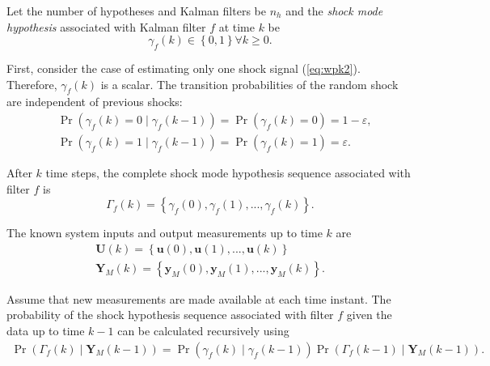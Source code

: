 Let the number of hypotheses and Kalman filters be $n_h$ and the \textit{shock mode hypothesis} associated with Kalman filter $f$ at time $k$ be
%
\begin{equation} \label{eq:gammak}
	\gamma_{f}(k) \in \left\{0, 1 \right\} \forall{k \ge 0}.
\end{equation}

First, consider the case of estimating only one shock signal (\ref{eq:wpk2}). Therefore, $\gamma_f(k)$ is a scalar. The transition probabilities of the random shock are independent of previous shocks:
%
\begin{equation} \label{eq:Pr_gammak_given_gammakm1}
	\begin{aligned}
		& \Pr\left(\gamma_{f}(k)=0 \mid \gamma_{f}(k-1)\right) = \Pr\left(\gamma_{f}(k)=0\right) = 1-\varepsilon, \\
		& \Pr\left(\gamma_{f}(k)=1 \mid \gamma_{f}(k-1)\right) = \Pr\left(\gamma_{f}(k)=1\right) = \varepsilon.
	\end{aligned}
\end{equation}

After $k$ time steps, the complete shock mode hypothesis sequence associated with filter $f$ is
\begin{equation} \label{eq:Gammak}
	\Gamma_f(k) = \left\{ \gamma_f(0), \gamma_f(1), ..., \gamma_f(k) \right\}.
\end{equation}
%

The known system inputs and output measurements up to time $k$ are
\begin{equation} \label{eq:Uk_Yk}
	\begin{aligned}
		\mathbf{U}(k) = \left\{ \mathbf{u}(0), \mathbf{u}(1), ..., \mathbf{u}(k) \right\} \\
		\mathbf{Y}_M(k) = \left\{ \mathbf{y}_M(0), \mathbf{y}_M(1), ..., \mathbf{y}_M(k) \right\}.
	\end{aligned}
\end{equation}

Assume that new measurements are made available at each time instant. The probability of the shock hypothesis sequence associated with filter $f$ given the data up to time $k-1$ can be calculated recursively using
\begin{multline} \label{eq:Pr_Gammak_given_Ykm1}
	\Pr(\Gamma_f(k) \mid \mathbf{Y}_M(k-1)) = 
	\Pr(\gamma_f(k) \mid \gamma_f(k-1)) \Pr(\Gamma_f(k-1) \mid \mathbf{Y}_M(k-1)).
\end{multline}

